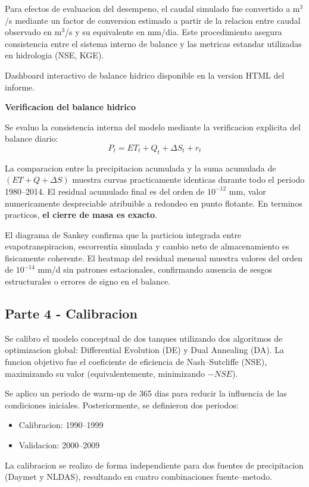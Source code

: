 \documentclass[12pt]{article}
\begin{document}
Para efectos de evaluacion del desempeno, el caudal simulado fue convertido a m$^3$/s mediante un factor de conversion estimado a partir de la relacion entre caudal observado en m$^3$/s y su equivalente en mm/dia. Este procedimiento asegura consistencia entre el sistema interno de balance y las metricas estandar utilizadas en hidrologia (NSE, KGE).

Dashboard interactivo de balance hidrico disponible en la version HTML del informe.

\textbf{Verificacion del balance hidrico}

Se evaluo la consistencia interna del modelo mediante la verificacion explicita del balance diario:
\[
P_t = ET_t + Q_t + \Delta S_t + r_t
\]

La comparacion entre la precipitacion acumulada y la suma acumulada de $(ET + Q + \Delta S)$ muestra curvas practicamente identicas durante todo el periodo 1980--2014. El residual acumulado final es del orden de $10^{-12}$ mm, valor numericamente despreciable atribuible a redondeo en punto flotante. En terminos practicos, \textbf{el cierre de masa es exacto}.

El diagrama de Sankey confirma que la particion integrada entre evapotranspiracion, escorrentia simulada y cambio neto de almacenamiento es fisicamente coherente. El heatmap del residual mensual muestra valores del orden de $10^{-14}$ mm/d sin patrones estacionales, confirmando ausencia de sesgos estructurales o errores de signo en el balance.

\subsection*{Parte 4 - Calibracion}
Se calibro el modelo conceptual de dos tanques utilizando dos algoritmos de optimizacion global: Differential Evolution (DE) y Dual Annealing (DA). La funcion objetivo fue el coeficiente de eficiencia de Nash--Sutcliffe (NSE), maximizando su valor (equivalentemente, minimizando $-NSE$).

Se aplico un periodo de warm-up de 365 dias para reducir la influencia de las condiciones iniciales. Posteriormente, se definieron dos periodos:
\begin{itemize}
\item Calibracion: 1990--1999
\item Validacion: 2000--2009
\end{itemize}

La calibracion se realizo de forma independiente para dos fuentes de precipitacion (Daymet y NLDAS), resultando en cuatro combinaciones fuente--metodo.
\end{document}
